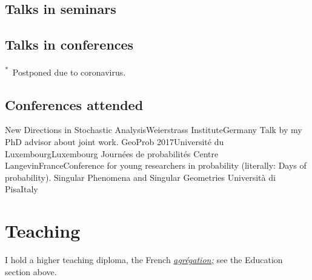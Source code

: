 \documentclass[11pt,classic]{moderncv}
\begin{document}
\subsection{Talks in seminars}


\subsection{Talks in conferences}


\smallskip

{\small\textsuperscript{*}~Postponed due to coronavirus.}

\subsection{Conferences attended}
   {New Directions in Stochastic Analysis}{Weierstrass Institute}{Germany}{}
   {Talk by my PhD advisor about joint work.}
   {GeoProb 2017}{Université du Luxembourg}{Luxembourg}{}{}
   {Journées de probabilités}
   {Centre Langevin}{France}{}{Conference for young researchers in probability (literally: Days of probability).}
   {Singular Phenomena and Singular Geometries}
   {Università di Pisa}{Italy}{}{}

\section{Teaching}

I hold a higher teaching diploma, the French \href{https://en.wikipedia.org/wiki/Agr\%C3\%A9gation}{\emph{agrégation;}} see the Education section above.

\medskip
\end{document}
